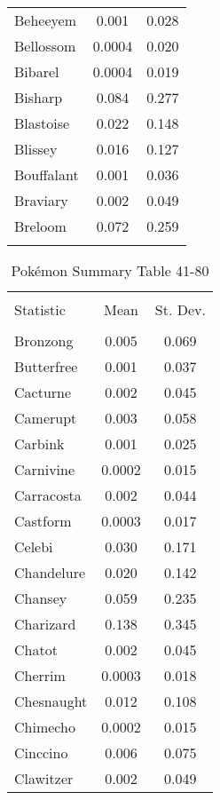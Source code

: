 \documentclass[12pt,twoside]{reedthesis}
\begin{document}
\begin{table}[!htbp]
\begin{tabular}{@{\extracolsep{5pt}}lcc}
  Beheeyem & 0.001 & 0.028 \\ 
  Bellossom & 0.0004 & 0.020 \\ 
  Bibarel & 0.0004 & 0.019 \\ 
  Bisharp & 0.084 & 0.277 \\ 
  Blastoise & 0.022 & 0.148 \\ 
  Blissey & 0.016 & 0.127 \\ 
  Bouffalant & 0.001 & 0.036 \\ 
  Braviary & 0.002 & 0.049 \\ 
  Breloom & 0.072 & 0.259 \\ 
  \hline \\[-1.8ex] 
  \end{tabular} 
  \end{table}
  
  \begin{table}[!htbp] \centering 
    \caption{Pokémon Summary Table 41-80} 
    \label{} 
  \begin{tabular}{@{\extracolsep{5pt}}lcc} 
  \\[-1.8ex]\hline 
  \hline \\[-1.8ex] 
  Statistic & \multicolumn{1}{c}{Mean} & \multicolumn{1}{c}{St. Dev.} \\ 
  \hline \\[-1.8ex] 
  Bronzong & 0.005 & 0.069 \\ 
  Butterfree & 0.001 & 0.037 \\ 
  Cacturne & 0.002 & 0.045 \\ 
  Camerupt & 0.003 & 0.058 \\ 
  Carbink & 0.001 & 0.025 \\ 
  Carnivine & 0.0002 & 0.015 \\ 
  Carracosta & 0.002 & 0.044 \\ 
  Castform & 0.0003 & 0.017 \\ 
  Celebi & 0.030 & 0.171 \\ 
  Chandelure & 0.020 & 0.142 \\ 
  Chansey & 0.059 & 0.235 \\ 
  Charizard & 0.138 & 0.345 \\ 
  Chatot & 0.002 & 0.045 \\ 
  Cherrim & 0.0003 & 0.018 \\ 
  Chesnaught & 0.012 & 0.108 \\ 
  Chimecho & 0.0002 & 0.015 \\ 
  Cinccino & 0.006 & 0.075 \\ 
  Clawitzer & 0.002 & 0.049 \\ 

\end{tabular}
\end{table}
\end{document}
